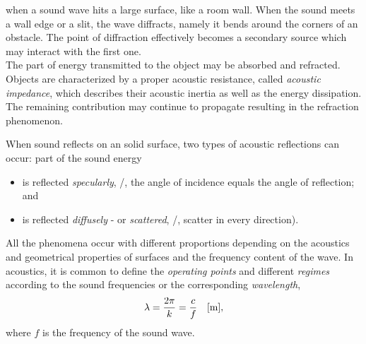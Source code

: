  when a sound wave hits a large surface, like a room wall.
When the sound meets a wall edge or a slit, the wave diffracts, namely it bends around the corners of an obstacle.
The point of diffraction effectively becomes a secondary source which may interact with the first one.
\\The part of energy transmitted to the object may be absorbed and refracted.
Objects are characterized by a proper acoustic resistance, called \textit{acoustic impedance}, which
describes their acoustic inertia as well as the energy dissipation.
The remaining contribution may continue to propagate resulting in the refraction phenomenon.

When sound reflects on an solid surface, two types of acoustic reflections can occur: part of the sound energy
\begin{itemize}
    \item is reflected \textit{specularly}, \ie/, the angle of incidence equals the angle of reflection; and
    \item is reflected \textit{diffusely} - or \textit{scattered}, \ie/, scatter in every direction).
\end{itemize}

All the phenomena occur with different proportions depending on the acoustics and geometrical properties of surfaces and the frequency content of the wave.
In acoustics, it is common to define the \textit{operating points} and different \textit{regimes}
according to the sound frequencies or the corresponding \textit{wavelength},
\begin{equation}
    \lambda = \frac{2 \pi}{k} = \frac{c}{f} \quad [\si{\metre}]
    ,
\end{equation}
where $f$ is the frequency of the sound wave.


